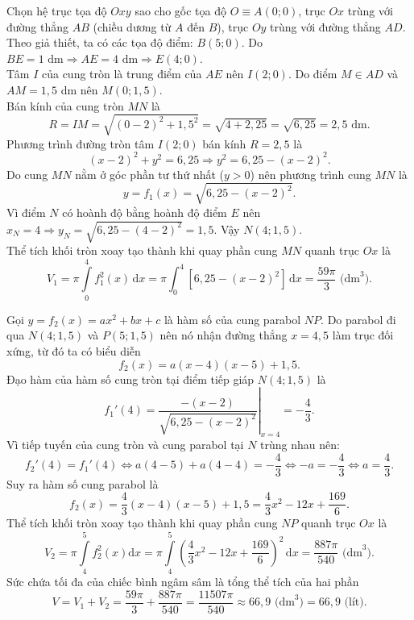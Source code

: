 \begin{ex}
{\begin{center}
\begin{tikzpicture}[scale=1.6, >=stealth, font=\footnotesize, line join=round, line cap=round]
			\end{tikzpicture}
		\end{center}
		Chọn hệ trục tọa độ $Oxy$ sao cho gốc tọa độ $O \equiv A(0;0)$, trục $Ox$ trùng với đường thẳng $AB$ (chiều dương từ $A$ đến $B$), trục $Oy$ trùng với đường thẳng $AD$.\\
		Theo giả thiết, ta có các tọa độ điểm: $B(5;0)$. Do $BE = 1\text{ dm} \Rightarrow AE = 4\text{ dm} \Rightarrow E(4;0)$.\\
		Tâm $I$ của cung tròn là trung điểm của $AE$ nên $I(2;0)$. Do điểm $M \in AD$ và $AM = 1{,}5$ dm nên $M(0;1{,}5)$.\\		
		Bán kính của cung tròn $MN$ là
		$$R = IM = \sqrt{(0-2)^2 + 1{,}5^2} = \sqrt{4 + 2{,}25} = \sqrt{6{,}25} = 2{,}5\text{ dm}.$$
		Phương trình đường tròn tâm $I(2;0)$ bán kính $R=2{,}5$ là
		$$(x-2)^2 + y^2 = 6{,}25 \Rightarrow y^2 = 6{,}25 - (x-2)^2.$$
		Do cung $MN$ nằm ở góc phần tư thứ nhất ($y > 0$) nên phương trình cung $MN$ là
		$$y = f_1(x) = \sqrt{6{,}25 - (x-2)^2}.$$
		Vì điểm $N$ có hoành độ bằng hoành độ điểm $E$ nên $x_N = 4 \Rightarrow y_N = \sqrt{6{,}25 - (4-2)^2} = 1{,}5$. Vậy $N(4;1{,}5)$.\\
		Thể tích khối tròn xoay tạo thành khi quay phần cung $MN$ quanh trục $Ox$ là
		$$V_1 = \pi \displaystyle\int\limits_{0}^{4} f_1^2(x) \mathrm{\,d}x = \pi \int_{0}^{4} \left[6{,}25 - (x-2)^2\right] \mathrm{\,d}x = \dfrac{59\pi}{3}\text{ (dm}^3\text{)}.$$
		
		Gọi $y = f_2(x) = ax^2 + bx + c$ là hàm số của cung parabol $NP$. Do parabol đi qua $N(4;1{,}5)$ và $P(5;1{,}5)$ nên nó nhận đường thẳng $x = 4{,}5$ làm trục đối xứng, từ đó ta có biểu diễn
		$$f_2(x) = a(x-4)(x-5) + 1{,}5.$$
		Đạo hàm của hàm số cung tròn tại điểm tiếp giáp $N(4;1{,}5)$ là
		$$f_1'(4) = \left. \dfrac{-(x-2)}{\sqrt{6{,}25 - (x-2)^2}} \right|_{x=4} = -\dfrac{4}{3}.$$
		Vì tiếp tuyến của cung tròn và cung parabol tại $N$ trùng nhau nên:
		$$f_2'(4) = f_1'(4) \Leftrightarrow a(4-5) + a(4-4) = -\dfrac{4}{3} \Leftrightarrow -a = -\dfrac{4}{3} \Leftrightarrow a = \dfrac{4}{3}.$$
		Suy ra hàm số cung parabol là
		$$f_2(x) = \dfrac{4}{3}(x-4)(x-5) + 1{,}5 = \dfrac{4}{3}x^2 - 12x + \dfrac{169}{6}.$$
		Thể tích khối tròn xoay tạo thành khi quay phần cung $NP$ quanh trục $Ox$ là
		$$V_2 = \pi \displaystyle\int\limits_{4}^{5} f_2^2(x) \mathrm{d}x = \pi \displaystyle\int\limits_{4}^{5} \left(\frac{4}{3}x^2 - 12x + \frac{169}{6}\right)^2 \mathrm{\,d}x = \frac{887\pi}{540}\text{ (dm}^3\text{)}.$$		
		Sức chứa tối đa của chiếc bình ngâm sâm là tổng thể tích của hai phần
		$$V = V_1 + V_2 = \frac{59\pi}{3} + \frac{887\pi}{540} = \frac{11507\pi}{540} \approx 66{,}9\text{ (dm}^3\text{)} = 66{,}9\text{ (lít)}.$$
	}
\end{ex}
